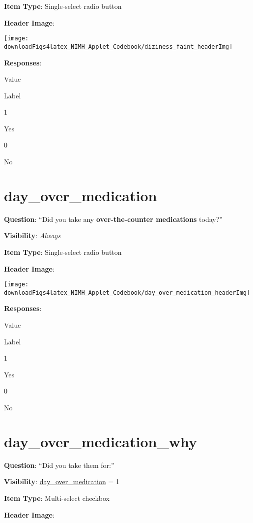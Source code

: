 \documentclass[]{book}
\begin{document}
\textbf{Item Type}: Single-select radio button

\textbf{Header Image}:

\begin{flushleft}\texttt{[image: downloadFigs4latex\_NIMH\_Applet\_Codebook/diziness\_faint\_headerImg]} \end{flushleft}

\textbf{Responses}:

Value

Label

1

Yes

0

No

\hypertarget{day_over_medication}{%
\section{day\_over\_medication}\label{day_over_medication}}

\textbf{Question}: ``Did you take any \textbf{over-the-counter medications} today?''

\textbf{Visibility}: \emph{Always}

\textbf{Item Type}: Single-select radio button

\textbf{Header Image}:

\begin{flushleft}\texttt{[image: downloadFigs4latex\_NIMH\_Applet\_Codebook/day\_over\_medication\_headerImg]} \end{flushleft}

\textbf{Responses}:

Value

Label

1

Yes

0

No

\hypertarget{day_over_medication_why}{%
\section{day\_over\_medication\_why}\label{day_over_medication_why}}

\textbf{Question}: ``Did you take them for:''

\textbf{Visibility}: \protect\hyperlink{day_over_medication}{day\_over\_medication} = 1

\textbf{Item Type}: Multi-select checkbox

\textbf{Header Image}:
\end{document}
